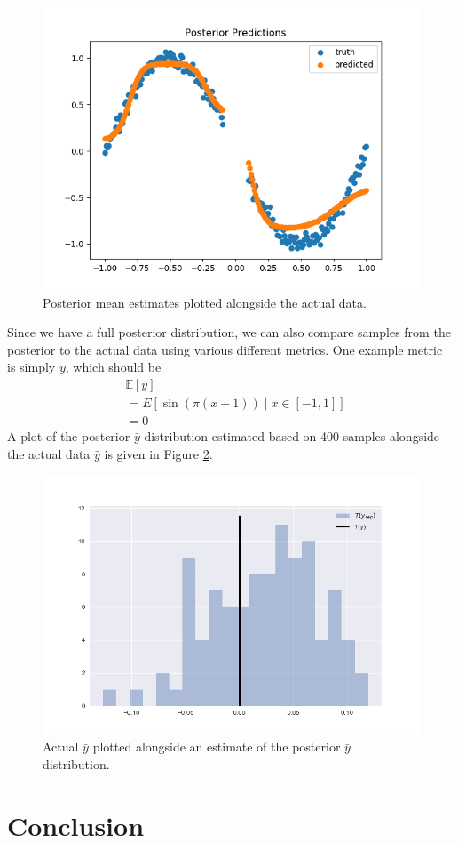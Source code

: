 \documentclass[
    preprint,
    12pt,
    letterpaper,
    longbibliography,
    nofootinbib,
    amsmath,
    amssymb,
    amsfonts,
]{revtex4-1}
\newcommand{\bk}[1]{\left[#1\right]}
\newcommand{\where}{\mid}
\newcommand{\bbm}[1]{\mathbb{#1}}
\begin{document}
\begin{figure}
\includegraphics{Figure_4.png}
\caption{Posterior mean estimates plotted alongside the actual data.}
\label{fig:4}
\end{figure}

Since we have a full posterior distribution, we can also compare samples from the posterior to the actual data using various different metrics. One example metric is simply $\bar y$, which should be
\begin{align*}
    & \bbm E\bk{\bar y} \\
    & = E\bk{\sin(\pi(x+1)) \where x \in [-1, 1]} \\
    & = 0
\end{align*}
A plot of the posterior $\bar y$ distribution estimated based on 400 samples alongside the actual data $\bar y$ is given in Figure \ref{fig:5}.

\begin{figure}
\includegraphics[scale=0.8]{Figure_5.png}
\caption{Actual $\bar y$ plotted alongside an estimate of the posterior $\bar y$ distribution.}
\label{fig:5}
\end{figure}

\section{Conclusion}


\end{document}
